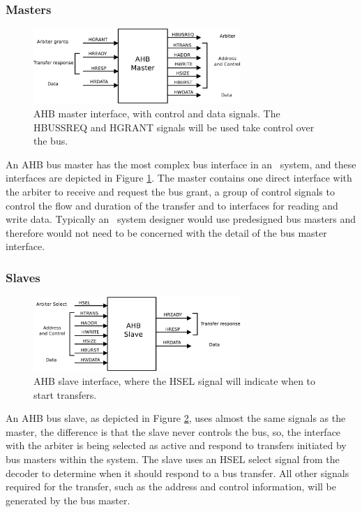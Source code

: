 \subsubsection{Masters}
\begin{figure}[!ht]
    \centering
    \includegraphics[width=0.7\textwidth]{figures/pdf/ahb_master_new.pdf}
    \caption{AHB master interface, with control and data signals. The HBUSSREQ and HGRANT signals  will be used take control over the bus.}
    \label{fig:masterint}
\end{figure}

 An AHB bus master has the most complex bus interface in an \amba~system, and these interfaces are depicted in Figure \ref{fig:masterint}. The master contains one direct interface with the arbiter to receive and request the bus grant, a group of control signals to control the flow and duration of the transfer and to interfaces for reading and write data.  Typically an \amba~system designer would use predesigned bus masters and therefore would not need to be concerned with the detail of the bus master interface.



\subsubsection{Slaves}

\begin{figure}[!ht]
    \centering
    \includegraphics[width=0.7\textwidth]{figures/pdf/ahb_slave_new.pdf}
    \caption{AHB slave interface, where the HSEL signal will indicate when to start transfers.}
    \label{fig:slaveint}
\end{figure}
An AHB bus slave, as depicted in Figure \ref{fig:slaveint}, uses almost the same signals as the master, the difference is that the slave never controls the bus, so,  the interface with the arbiter is being selected as active and respond to transfers initiated by bus masters within the system. The slave uses an HSEL select signal from the decoder to determine when it should respond to a bus transfer. All other signals required for the transfer, such as the address and control information, will be generated by the bus master.
 
